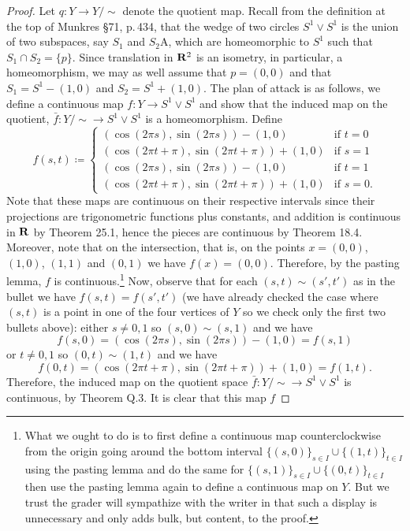 \begin{proof}
Let $q\colon Y\to Y/{\sim}$ denote the quotient map. Recall from the
definition at the top of Munkres \S71, p.\,434, that the wedge of two
circles $S^1\vee S^1$ is the union of two subspaces, say $S_1$ and $S_2$A,
which are homeomorphic to $S^1$ such that $S_1\cap S_2=\{p\}$. Since
translation in $\mathbf{R}^2$ is an isometry, in particular, a homeomorphism, we
may as well assume that $p=(0,0)$ and that $S_1=S^1-(1,0)$ and
$S_2=S^1+(1,0)$. The plan of attack is as follows, we define a continuous
map $f\colon Y\to S^1\vee S^1$ and show that the induced map on the
quotient, $\bar f\colon Y/{\sim}\to S^1\vee S^1$ is a homeomorphism. Define
\[
f(s,t)\coloneqq
\begin{cases}
(\cos(2\pi s),\sin(2\pi s))-(1,0)&\text{if $t=0$}\\
(\cos(2\pi t+\pi),\sin(2\pi t+\pi))+(1,0)&\text{if $s=1$}\\
(\cos(2\pi s),\sin(2\pi s))-(1,0)&\text{if $t=1$}\\
(\cos(2\pi t+\pi),\sin(2\pi t+\pi))+(1,0)&\text{if $s=0$}.
\end{cases}
\]
Note that these maps are continuous on their respective intervals since
their projections are trigonometric functions plus constants, and addition
is continuous in $\mathbf{R}$ by Theorem 25.1, hence the pieces are continuous by
Theorem 18.4. Moreover, note that on the intersection, that is, on the
points $x=(0,0)$, $(1,0)$, $(1,1)$ and $(0,1)$ we have
$f(x)=(0,0)$. Therefore, by the pasting lemma, $f$ is
continuous.\footnote{What we ought to do is to first define a continuous map
  counterclockwise from the origin going around the bottom interval
  $\{(s,0)\}_{s\in I}\cup\{(1,t)\}_{t\in I}$ using the pasting lemma and do
  the same for $\{(s,1)\}_{s\in I}\cup\{(0,t)\}_{t\in I}$ then use the
  pasting lemma again to define a continuous map on $Y$. But we trust the
  grader will sympathize with the writer in that such a display is
  unnecessary and only adds bulk, but content, to the proof.} Now, observe
that for each $(s,t)\sim(s',t')$ as in the bullet we have
$f(s,t)=f(s',t')$ (we have already checked the case where $(s,t)$ is a
point in one of the four vertices of $Y$ so we check only the first two
bullets above): either $s\neq 0,1$ so $(s,0)\sim (s,1)$ and we have
\[
f(s,0)=(\cos(2\pi s),\sin(2\pi s))-(1,0)=f(s,1)
\]
or $t\neq 0,1$ so $(0,t)\sim(1,t)$ and we have
\[
f(0,t)=(\cos(2\pi t+\pi),\sin(2\pi t+\pi))+(1,0)=f(1,t).
\]
Therefore, the induced map on the quotient space $\bar f\colon Y/{\sim}\to
S^1\vee S^1$ is continuous, by Theorem Q.3. It is clear that this map $f$

\end{proof}
